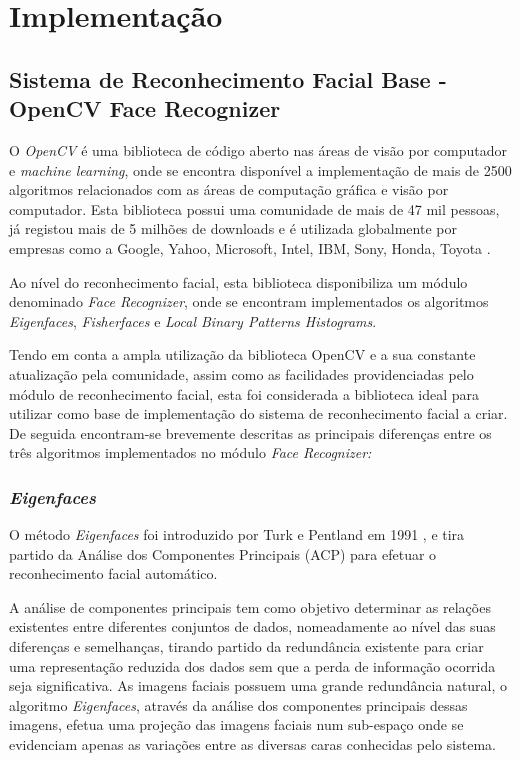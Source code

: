 \section{Implementação}

\subsection{Sistema de Reconhecimento Facial Base - OpenCV Face Recognizer}
O \textit{OpenCV} é uma biblioteca de código aberto nas áreas de visão por computador e \textit{machine learning}, onde se encontra disponível a implementação de mais de 2500 algoritmos relacionados com as áreas de computação gráfica e visão por computador. Esta biblioteca possui uma comunidade de mais de 47 mil pessoas, já registou mais de 5 milhões de downloads e é utilizada globalmente por empresas como a Google, Yahoo, Microsoft, Intel, IBM, Sony, Honda, Toyota \cite{Team}. 

Ao nível do reconhecimento facial, esta biblioteca disponibiliza um módulo denominado \textit{Face Recognizer}, onde se encontram implementados os algoritmos \textit{Eigenfaces}, \textit{Fisherfaces} e \textit{Local Binary Patterns Histograms}.

Tendo em conta a ampla utilização da biblioteca OpenCV e a sua constante atualização pela comunidade, assim como as facilidades providenciadas pelo módulo de reconhecimento facial, esta foi considerada a biblioteca ideal para utilizar como base de implementação do sistema de reconhecimento facial a criar. De seguida encontram-se brevemente descritas as principais diferenças entre os três algoritmos implementados no módulo \textit{Face Recognizer:}

\subsubsection*{\textit{Eigenfaces}}
O método \textit{Eigenfaces} foi introduzido por Turk e Pentland em 1991 \cite{Turk1991}, e tira partido da Análise dos Componentes Principais (ACP) para efetuar o reconhecimento facial automático.

A análise de componentes principais tem como objetivo determinar as relações existentes entre diferentes conjuntos de dados, nomeadamente ao nível das suas diferenças e semelhanças, tirando partido da redundância existente para criar uma representação reduzida dos dados sem que a perda de informação ocorrida seja significativa. As imagens faciais possuem uma grande redundância natural, o algoritmo \textit{Eigenfaces}, através da análise dos componentes principais dessas imagens, efetua uma projeção das imagens faciais num sub-espaço onde se evidenciam apenas as variações entre as diversas caras conhecidas pelo sistema.

